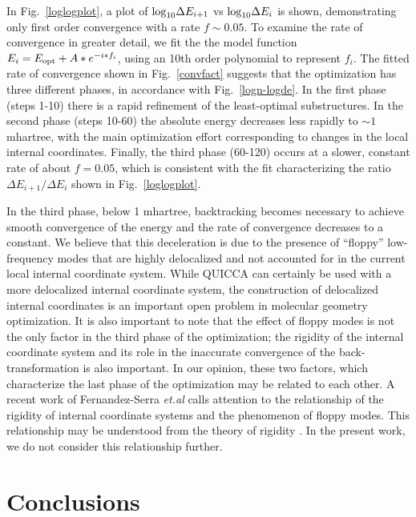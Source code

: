 \documentclass[prl,twocolumn,showpacs,twocolumngrid,superbib]{revtex4}
\begin{document}
In Fig.~\ref{loglogplot}, a plot of ${\rm log}_{10}{\Delta E_{i+1}}$ vs ${\rm log }_{10} {\Delta E_{i}}$ 
is shown, demonstrating only first order convergence with a rate $f \sim 0.05$.   To examine the rate of convergence
in greater detail, we fit the the model function $E_{i}=E_{\rm opt}+A*e^{-i * f_i}$, using  
an 10th order polynomial to represent $f_i$.  The fitted rate of convergence shown in Fig.~\ref{convfact}
suggests that the optimization has three different phases, in accordance with Fig.~\ref{logn-logde}.
In the first phase (steps 1-10) there is a rapid refinement of the least-optimal substructures. In the 
second phase (steps 10-60) the absolute energy decreases less rapidly to $\sim 1$ mhartree, with the  
main optimization effort corresponding to changes in the local internal coordinates. Finally, the third phase 
(60-120) occurs at a slower, constant rate of about $f=0.05$, which is consistent with the fit characterizing 
the ratio ${\Delta E_{i+1}}/{\Delta E_{i}}$ shown in Fig.~\ref{loglogplot}.

In the third phase, below 1 mhartree, backtracking becomes necessary to achieve smooth 
convergence of the energy and the rate of convergence decreases to a constant.  We believe
that this deceleration is due to the presence of ``floppy'' low-frequency modes
that are highly delocalized and not accounted for in the current local internal 
coordinate system.  While QUICCA can certainly be used with a more delocalized 
internal coordinate system, the construction of delocalized internal coordinates 
is an important open problem in molecular geometry optimization.   It is also important to note that 
the effect of floppy modes is not the only factor in the third phase of the optimization; the rigidity 
of the internal coordinate system and its role in the inaccurate convergence of the back-transformation 
is also important. In our opinion, these two factors, which characterize the last phase of the 
optimization may be related to each other.  A recent work of Fernandez-Serra {\it et.al} \cite{MFernandez-Serra03} 
calls attention to the relationship of the rigidity of internal coordinate systems and the 
phenomenon of floppy modes. This relationship may be understood from the theory of 
rigidity \cite{JPhillips85}. In the present work, we do not 
consider this relationship further.

\section{Conclusions}
\end{document}
